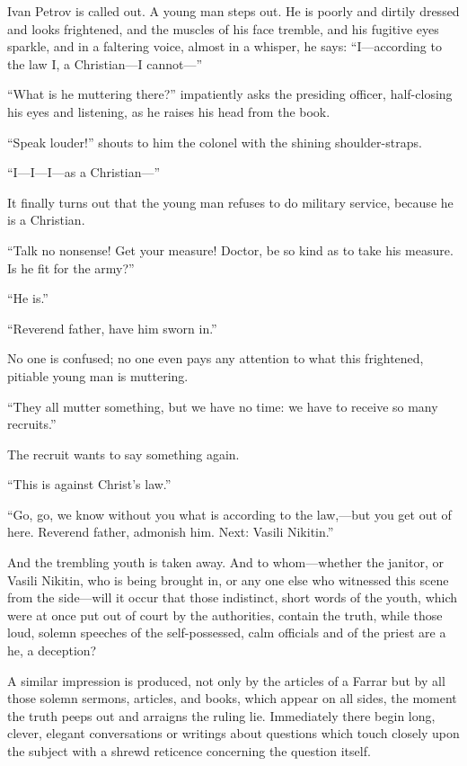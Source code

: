 \documentclass{book}
\begin{document}
Ivan Petrov is called out. A young man steps out. He is poorly and dirtily dressed and looks frightened, and the muscles of his face tremble, and his fugitive eyes sparkle, and in a faltering voice, almost in a whisper, he says: “I—according to the law I, a Christian—I cannot—”

“What is he muttering there?” impatiently asks the presiding officer, half-closing his eyes and listening, as he raises his head from the book.

“Speak louder!” shouts to him the colonel with the shining shoulder-straps.

“I—I—I—as a Christian—”

It finally turns out that the young man refuses to do military service, because he is a Christian.

“Talk no nonsense! Get your measure! Doctor, be so kind as to take his measure. Is he fit for the army?”

“He is.”

“Reverend father, have him sworn in.”

No one is confused; no one even pays any attention to what this frightened, pitiable young man is muttering.

“They all mutter something, but we have no time: we have to receive so many recruits.”

The recruit wants to say something again.

“This is against Christ’s law.”

“Go, go, we know without you what is according to the law,—but you get out of here. Reverend father, admonish him. Next: Vasili Nikitin.”

And the trembling youth is taken away. And to whom—whether the janitor, or Vasili Nikitin, who is being brought in, or any one else who witnessed this scene from the side—will it occur that those indistinct, short words of the youth, which were at once put out of court by the authorities, contain the truth, while those loud, solemn speeches of the self-possessed, calm officials and of the priest are a he, a deception?

A similar impression is produced, not only by the articles of a Farrar but by all those solemn sermons, articles, and books, which appear on all sides, the moment the truth peeps out and arraigns the ruling lie. Immediately there begin long, clever, elegant conversations or writings about questions which touch closely upon the subject with a shrewd reticence concerning the question itself.
\end{document}
